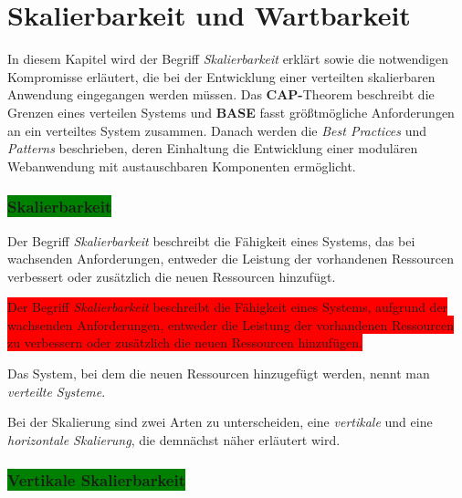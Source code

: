 \chapter{Skalierbarkeit und Wartbarkeit}

In diesem Kapitel wird der Begriff \textit{Skalierbarkeit} erklärt sowie die notwendigen Kompromisse erläutert, die bei der Entwicklung einer verteilten skalierbaren Anwendung eingegangen werden müssen. Das \textbf{CAP-}Theorem beschreibt die Grenzen eines verteilen Systems und \textbf{BASE} fasst größtmögliche Anforderungen an ein verteiltes System zusammen. Danach werden die \textit{Best Practices} und \textit{Patterns} beschrieben, deren Einhaltung die Entwicklung einer modulären Webanwendung mit austauschbaren Komponenten ermöglicht. 

\subsection{\colorbox{green}{Skalierbarkeit}}\label{scale}

Der Begriff \textit{Skalierbarkeit} beschreibt die Fähigkeit eines Systems, das bei wachsenden Anforderungen, entweder die Leistung der vorhandenen Ressourcen verbessert oder zusätzlich die neuen Ressourcen hinzufügt.

\colorbox{red}{Der Begriff \textit{Skalierbarkeit} beschreibt die Fähigkeit eines Systems, aufgrund der wachsenden Anforderungen, entweder die Leistung der vorhandenen Ressourcen zu verbessern oder zusätzlich die neuen Ressourcen hinzufügen.}

Das System, bei dem die neuen Ressourcen hinzugefügt werden, nennt man \textit{verteilte Systeme}.

Bei der Skalierung sind zwei Arten zu unterscheiden, eine \textit{vertikale} und eine \textit{horizontale Skalierung}, die demnächst näher erläutert wird.

\subsection{\colorbox{green}{Vertikale Skalierbarkeit}}

